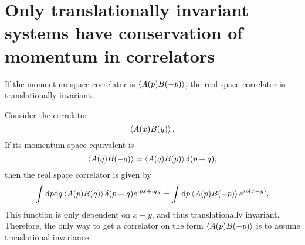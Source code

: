 \section{Only translationally invariant systems have conservation of momentum in correlators}
\begin{theorem}
  If the momentum space correlator is $\braket{A(p)B(-p)}$, the real space correlator is translationally invariant.
\end{theorem}
\begin{Proof}
Consider the correlator
\begin{equation}
  \Braket{A(x)B(y)}.
\end{equation}
If its momentum space equivalent is
\begin{equation}
  \Braket{A(q)B(-q)} = \Braket{A(q)B(p)} \delta (p+q),
\end{equation}
then the real space correlator is given by
\begin{equation}
  \int \mathrm{d}p \mathrm{d}q
  \Braket{A(p)B(q)}\delta (p+q)
  e^{ipx + iqy}
  = \int \mathrm{d}p \Braket{A(p)B(-p)} e^{ip(x-y)}.
\end{equation}
This function is only dependent on $x-y$, and thus translationally invariant.
Therefore, the only way to get a correlator on the form $\braket{A(p)B(-p)}$ is to assume trnaslational invariance.
\end{Proof}
